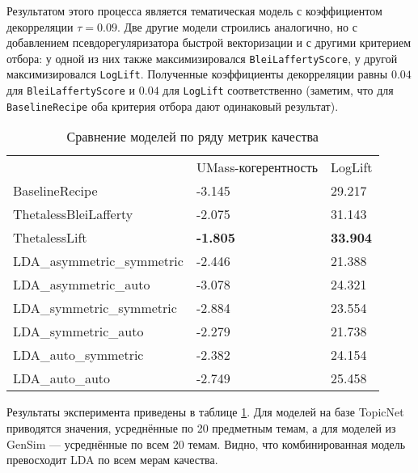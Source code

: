 Результатом этого процесса является тематическая модель с коэффициентом декорреляции $\tau=0.09$. Две другие модели строились аналогично, но с добавлением псевдорегуляризатора быстрой векторизации и с другими критерием отбора: у одной из них также максимизировался \texttt{BleiLaffertyScore}, у другой максимизировался \texttt{LogLift}. Полученные коэффициенты декорреляции равны $0.04$ для \texttt{BleiLaffertyScore} и $0.04$ для \texttt{LogLift} соответственно (заметим, что для \texttt{BaselineRecipe} оба критерия отбора дают одинаковый результат).  


\begin{table}[h]
\begin{tabular}{lll}
                         & UMass-когерентность & LogLift             \\
BaselineRecipe           & -3.145         & 29.217         \\
ThetalessBleiLafferty   & -2.075         & 31.143           \\
ThetalessLift           & \textbf{-1.805}  & \textbf{33.904} \\
LDA\_asymmetric\_symmetric & -2.446          & 21.388           \\
LDA\_asymmetric\_auto      & -3.078          & 24.321          \\
LDA\_symmetric\_symmetric  & -2.884          & 23.554         \\
LDA\_symmetric\_auto       & -2.279         & 21.738          \\
LDA\_auto\_symmetric       & -2.382           & 24.154          \\
LDA\_auto\_auto            & -2.749          & 25.458
\end{tabular}
\caption{Сравнение моделей по ряду метрик качества}
\label{tbl:better_baseline}
\end{table} 

Результаты эксперимента приведены в таблице \ref{tbl:better_baseline}. Для моделей на базе TopicNet приводятся значения, усреднённые по 20 предметным темам, а для моделей из GenSim --- усреднённые по всем 20 темам. Видно, что комбинированная модель превосходит LDA по всем мерам качества.  



